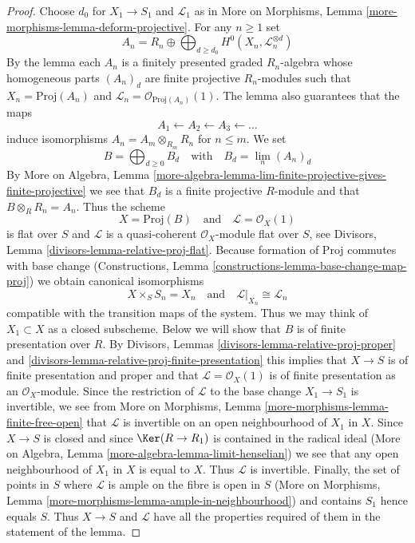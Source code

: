 \begin{proof}
Choose $d_0$ for $X_1 \to S_1$ and $\mathcal{L}_1$ as in
More on Morphisms, Lemma \ref{more-morphisms-lemma-deform-projective}.
For any $n \geq 1$ set
$$
A_n = R_n \oplus
\bigoplus\nolimits_{d \geq d_0} H^0(X_n, \mathcal{L}_n^{\otimes d})
$$
By the lemma each $A_n$ is a finitely presented graded $R_n$-algebra
whose homogeneous parts $(A_n)_d$ are finite projective $R_n$-modules
such that $X_n = \text{Proj}(A_n)$ and
$\mathcal{L}_n = \mathcal{O}_{\text{Proj}(A_n)}(1)$.
The lemma also guarantees that the maps
$$
A_1 \leftarrow A_2 \leftarrow A_3 \leftarrow \ldots
$$
induce isomorphisms $A_n = A_m \otimes_{R_m} R_n$ for $n \leq m$.
We set
$$
B = \bigoplus\nolimits_{d \geq 0} B_d
\quad\text{with}\quad
B_d = \lim_n (A_n)_d
$$
By More on Algebra, Lemma
\ref{more-algebra-lemma-lim-finite-projective-gives-finite-projective}
we see that $B_d$ is a finite projective $R$-module and that
$B \otimes_R R_n = A_n$. Thus the scheme
$$
X = \text{Proj}(B)
\quad\text{and}\quad
\mathcal{L} = \mathcal{O}_X(1)
$$
is flat over $S$ and $\mathcal{L}$ is a quasi-coherent $\mathcal{O}_X$-module
flat over $S$, see
Divisors, Lemma \ref{divisors-lemma-relative-proj-flat}.
Because formation of Proj commutes with base change
(Constructions, Lemma \ref{constructions-lemma-base-change-map-proj})
we obtain canonical isomorphisms
$$
X \times_S S_n = X_n
\quad\text{and}\quad
\mathcal{L}|_{X_n} \cong \mathcal{L}_n
$$
compatible with the transition maps of the system.
Thus we may think of $X_1 \subset X$ as a closed subscheme.
Below we will show that $B$ is of finite presentation over $R$.
By Divisors, Lemmas \ref{divisors-lemma-relative-proj-proper} and
\ref{divisors-lemma-relative-proj-finite-presentation}
this implies that $X \to S$ is of finite presentation
and proper and that $\mathcal{L} = \mathcal{O}_X(1)$
is of finite presentation as an $\mathcal{O}_X$-module.
Since the restriction of $\mathcal{L}$ to the base change
$X_1 \to S_1$ is invertible, we see from
More on Morphisms, Lemma \ref{more-morphisms-lemma-finite-free-open}
that $\mathcal{L}$ is invertible on an open neighbourhood of $X_1$ in $X$.
Since $X \to S$ is closed and since $\Ker(R \to R_1)$
is contained in the radical ideal
(More on Algebra, Lemma \ref{more-algebra-lemma-limit-henselian})
we see that any open neighbourhood of $X_1$ in $X$ is equal to $X$.
Thus $\mathcal{L}$ is invertible. Finally, the set of points in
$S$ where $\mathcal{L}$ is ample on the fibre is open in $S$
(More on Morphisms, Lemma \ref{more-morphisms-lemma-ample-in-neighbourhood})
and contains $S_1$ hence equals $S$. Thus $X \to S$ and $\mathcal{L}$
have all the properties required of them in the statement of the lemma.


\end{proof}
